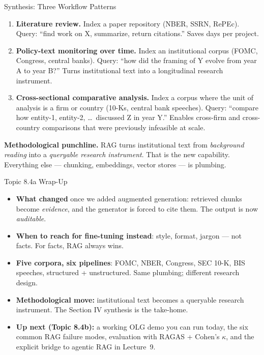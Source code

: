 \begin{frame}{Synthesis: Three Workflow Patterns}
\begin{enumerate}
\item \textbf{Literature review.} Index a paper repository (NBER, SSRN, RePEc). Query: ``find work on X, summarize, return citations.'' Saves days per project.

\medskip
\item \textbf{Policy-text monitoring over time.} Index an institutional corpus (FOMC, Congress, central banks). Query: ``how did the framing of Y evolve from year A to year B?'' Turns institutional text into a longitudinal research instrument.

\medskip
\item \textbf{Cross-sectional comparative analysis.} Index a corpus where the unit of analysis is a firm or country (10-Ks, central bank speeches). Query: ``compare how entity-1, entity-2, \dots\ discussed Z in year Y.'' Enables cross-firm and cross-country comparisons that were previously infeasible at scale.
\end{enumerate}

\bigskip
\textbf{Methodological punchline.} RAG turns institutional text from \emph{background reading} into a \emph{queryable research instrument}. That is the new capability. Everything else --- chunking, embeddings, vector stores --- is plumbing.
\end{frame}

\begin{frame}{Topic 8.4a Wrap-Up}
\begin{itemize}
\item \textbf{What changed} once we added augmented generation: retrieved chunks become \emph{evidence}, and the generator is forced to cite them. The output is now \emph{auditable}.

\medskip
\item \textbf{When to reach for fine-tuning instead}: style, format, jargon --- not facts. For facts, RAG always wins.

\medskip
\item \textbf{Five corpora, six pipelines}: FOMC, NBER, Congress, SEC 10-K, BIS speeches, structured + unstructured. Same plumbing; different research design.

\medskip
\item \textbf{Methodological move:} institutional text becomes a queryable research instrument. The Section IV synthesis is the take-home.

\medskip
\item \textbf{Up next (Topic 8.4b):} a working OLG demo you can run today, the six common RAG failure modes, evaluation with RAGAS + Cohen's $\kappa$, and the explicit bridge to agentic RAG in Lecture~9.
\end{itemize}
\end{frame}


